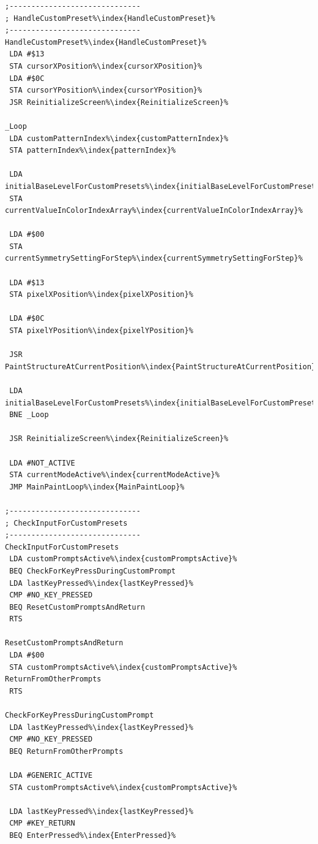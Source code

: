 \clearpage
\begin{minipage}[b]{0.33\linewidth}
\begin{lrbox}{\mybox}%
\begin{lstlisting}[basicstyle=\ttfamily\tiny,escapechar=\%]
;------------------------------
; HandleCustomPreset%\index{HandleCustomPreset}%
;------------------------------
HandleCustomPreset%\index{HandleCustomPreset}%
 LDA #$13
 STA cursorXPosition%\index{cursorXPosition}%
 LDA #$0C
 STA cursorYPosition%\index{cursorYPosition}%
 JSR ReinitializeScreen%\index{ReinitializeScreen}%

_Loop   
 LDA customPatternIndex%\index{customPatternIndex}%
 STA patternIndex%\index{patternIndex}%

 LDA initialBaseLevelForCustomPresets%\index{initialBaseLevelForCustomPresets}%
 STA currentValueInColorIndexArray%\index{currentValueInColorIndexArray}%

 LDA #$00
 STA currentSymmetrySettingForStep%\index{currentSymmetrySettingForStep}%

 LDA #$13
 STA pixelXPosition%\index{pixelXPosition}%

 LDA #$0C
 STA pixelYPosition%\index{pixelYPosition}%

 JSR PaintStructureAtCurrentPosition%\index{PaintStructureAtCurrentPosition}%

 LDA initialBaseLevelForCustomPresets%\index{initialBaseLevelForCustomPresets}%
 BNE _Loop

 JSR ReinitializeScreen%\index{ReinitializeScreen}%

 LDA #NOT_ACTIVE
 STA currentModeActive%\index{currentModeActive}%
 JMP MainPaintLoop%\index{MainPaintLoop}%

;------------------------------
; CheckInputForCustomPresets
;------------------------------
CheckInputForCustomPresets
 LDA customPromptsActive%\index{customPromptsActive}%
 BEQ CheckForKeyPressDuringCustomPrompt
 LDA lastKeyPressed%\index{lastKeyPressed}%
 CMP #NO_KEY_PRESSED
 BEQ ResetCustomPromptsAndReturn
 RTS

ResetCustomPromptsAndReturn
 LDA #$00
 STA customPromptsActive%\index{customPromptsActive}%
ReturnFromOtherPrompts
 RTS

CheckForKeyPressDuringCustomPrompt
 LDA lastKeyPressed%\index{lastKeyPressed}%
 CMP #NO_KEY_PRESSED
 BEQ ReturnFromOtherPrompts

 LDA #GENERIC_ACTIVE
 STA customPromptsActive%\index{customPromptsActive}%

 LDA lastKeyPressed%\index{lastKeyPressed}%
 CMP #KEY_RETURN
 BEQ EnterPressed%\index{EnterPressed}%


\end{lstlisting}
\end{lrbox}
\end{minipage}
